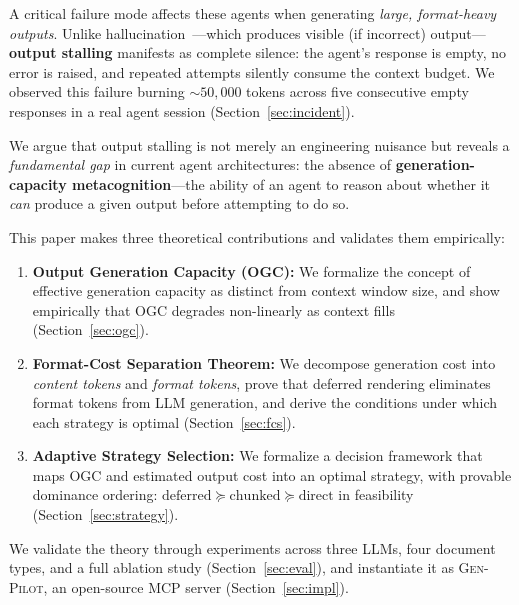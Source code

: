\documentclass[11pt,twocolumn]{article}
\newcommand{\genpilot}{\textsc{Gen-Pilot}}
\begin{document}
A critical failure mode affects these agents when generating
\emph{large, format-heavy outputs}.  Unlike hallucination~\cite{ji2023hallucination,huang2023hallucination}---which produces visible (if incorrect)
output---\textbf{output stalling} manifests as complete silence:
the agent's response is empty, no error is raised, and repeated
attempts silently consume the context budget.  We observed this
failure burning ${\sim}50{,}000$ tokens across five consecutive
empty responses in a real agent session (Section~\ref{sec:incident}).

We argue that output stalling is not merely an engineering nuisance
but reveals a \emph{fundamental gap} in current agent architectures:
the absence of \textbf{generation-capacity metacognition}---the
ability of an agent to reason about whether it \emph{can} produce
a given output before attempting to do so.

This paper makes three theoretical contributions and validates
them empirically:

\begin{enumerate}[leftmargin=*,itemsep=2pt]
  \item \textbf{Output Generation Capacity (OGC):} We formalize the
    concept of effective generation capacity as distinct from context
    window size, and show empirically that OGC degrades
    non-linearly as context fills (Section~\ref{sec:ogc}).

  \item \textbf{Format-Cost Separation Theorem:} We decompose
    generation cost into \emph{content tokens} and \emph{format tokens},
    prove that deferred rendering eliminates format tokens from LLM
    generation, and derive the conditions under which each strategy
    is optimal (Section~\ref{sec:fcs}).

  \item \textbf{Adaptive Strategy Selection:} We formalize a
    decision framework that maps OGC and estimated output cost into
    an optimal strategy, with provable dominance ordering:
    $\text{deferred} \succeq \text{chunked} \succeq \text{direct}$
    in feasibility (Section~\ref{sec:strategy}).
\end{enumerate}

We validate the theory through experiments across three LLMs,
four document types, and a full ablation study
(Section~\ref{sec:eval}), and instantiate it as \genpilot{},
an open-source MCP server (Section~\ref{sec:impl}).


\end{document}
